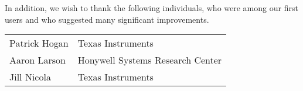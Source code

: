 In addition, we wish to thank the following individuals, who were among
our first users and who suggested many significant improvements.
\begin{center}
\begin{tabular}{ll}
Patrick Hogan    &       Texas Instruments \\
Aaron Larson     &       Honywell Systems Research Center \\
Jill Nicola      &       Texas Instruments \\
\end{tabular}
\end{center}

%
%
%
%
%

